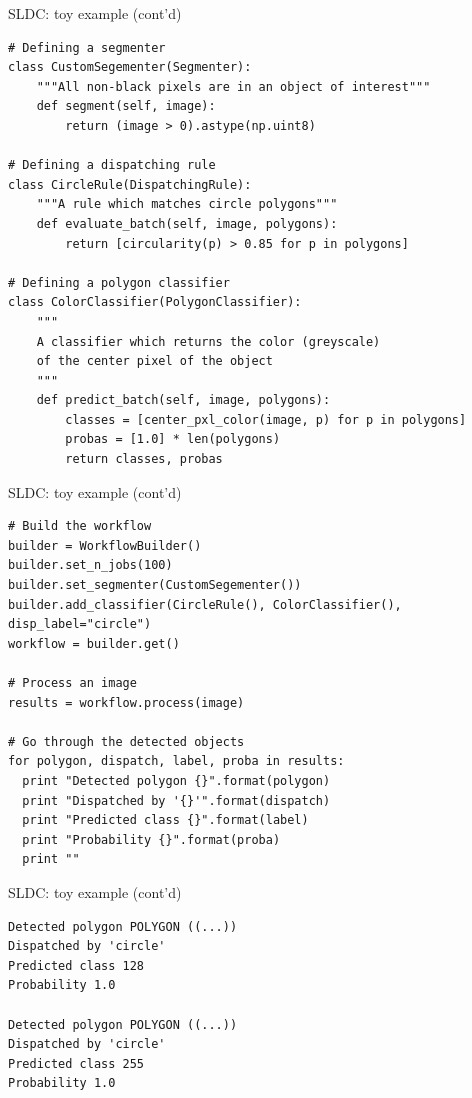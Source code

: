 \documentclass{beamer}
\begin{document}
\begin{frame}[fragile]{SLDC: toy example (cont'd)}
\begin{verbatim}
# Defining a segmenter
class CustomSegementer(Segmenter):
    """All non-black pixels are in an object of interest"""
    def segment(self, image):
        return (image > 0).astype(np.uint8)
        
# Defining a dispatching rule 
class CircleRule(DispatchingRule):
    """A rule which matches circle polygons"""
    def evaluate_batch(self, image, polygons):
        return [circularity(p) > 0.85 for p in polygons]

# Defining a polygon classifier
class ColorClassifier(PolygonClassifier):
    """
    A classifier which returns the color (greyscale) 
    of the center pixel of the object
    """
    def predict_batch(self, image, polygons):
        classes = [center_pxl_color(image, p) for p in polygons]
        probas = [1.0] * len(polygons)
        return classes, probas
\end{verbatim}
\end{frame}


\begin{frame}[fragile]{SLDC: toy example (cont'd)}
\begin{verbatim}
# Build the workflow
builder = WorkflowBuilder()
builder.set_n_jobs(100)
builder.set_segmenter(CustomSegementer())
builder.add_classifier(CircleRule(), ColorClassifier(), disp_label="circle")
workflow = builder.get()

# Process an image
results = workflow.process(image)

# Go through the detected objects
for polygon, dispatch, label, proba in results:
  print "Detected polygon {}".format(polygon)
  print "Dispatched by '{}'".format(dispatch)
  print "Predicted class {}".format(label)
  print "Probability {}".format(proba)
  print ""
\end{verbatim}
\end{frame}


\begin{frame}[fragile]{SLDC: toy example  (cont'd)}
\begin{verbatim}
Detected polygon POLYGON ((...))
Dispatched by 'circle'
Predicted class 128
Probability 1.0

Detected polygon POLYGON ((...))
Dispatched by 'circle'
Predicted class 255
Probability 1.0
\end{verbatim}
\end{frame}
\end{document}
